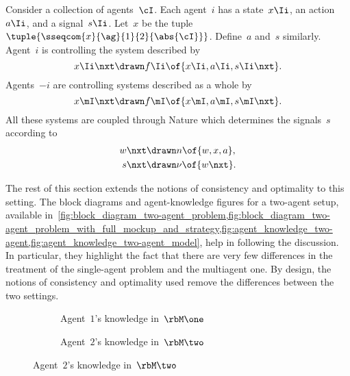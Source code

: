 Consider a collection of agents~\(\cI\).
Each agent~\(i\) has a state~\(x\Ii\), an action~\(a\Ii\), and a signal~\(s\Ii\).
Let~\(x\) be the tuple~\(\tuple{\sseqcom{x}{\ag}{1}{2}{\abs{\cI}}}\).
Define~\(a\) and~\(s\) similarly.
Agent~\(i\) is controlling the system described by
\begin{equation}
\label{eq:private_dynamic_i}
x\Ii\nxt \drawn  f\Ii \of{x\Ii, a\Ii, s\Ii\nxt}.
\end{equation}
Agents~\(-i\) are controlling systems described as a whole by
\begin{equation}
\label{eq:private_dynamic_-i}
x\mI\nxt \drawn  f\mI \of{x\mI, a\mI, s\mI\nxt}.
\end{equation}
All these systems are coupled through Nature which determines the signals~\(s\) according to
\begin{subequations}
\label{eq:nature_system_i}
\begin{align}
\label{eq:nature_dynamic_i}
w\nxt &\drawn n \of{w, x, a}, \\
\label{eq:nature_signal_i}
s\nxt &\drawn \nu \of{w\nxt}.
\end{align}
\end{subequations}

The rest of this section extends the notions of consistency and optimality to this setting.
The block diagrams and agent-knowledge figures for a two-agent setup, available in~\cref{fig:block_diagram_two-agent_problem,fig:block_diagram_two-agent_problem_with_full_mockup_and_strategy,fig:agent_knowledge_two-agent,fig:agent_knowledge_two-agent_model}, help in following the discussion.
In particular, they highlight the fact that there are very few differences in the treatment of the single-agent problem and the multiagent one.
By design, the notions of consistency and optimality used remove the differences between the two settings.

\begin{figure}[htp]
\begin{subfigure}{\textwidth}
\centering
{
  \renewcommand{\agparameter}{1}
}
\caption{Agent~\(1\)'s knowledge in~\(\rbM\one\)}

\end{subfigure}

\vspace{40pt}

\begin{subfigure}{\textwidth}
\centering
{
  \renewcommand{\agparameter}{2}
}
\caption{Agent~\(2\)'s knowledge in~\(\rbM\two\)}
\end{subfigure}%

\vspace{40pt}

\label{fig:agent_knowledge_two-agent_model}
\end{figure}

